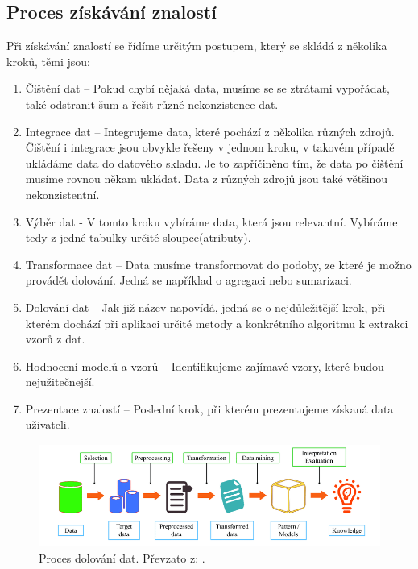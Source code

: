\subsection*{Proces získávání znalostí}
Při získávání znalostí se řídíme určitým postupem, který se skládá z několika kroků, těmi jsou: \cite[Kapitola~1]{Kamber}

\begin{enumerate}
  \item{Čištění dat – Pokud chybí nějaká data, musíme se se ztrátami vypořádat, také odstranit šum a řešit různé nekonzistence dat.}
  \item{Integrace dat – Integrujeme data, které pochází z několika různých zdrojů.
Čištění i integrace jsou obvykle řešeny v jednom kroku, v takovém případě ukládáme data do datového skladu.  Je to  zapříčiněno tím, že data po čištění musíme rovnou někam ukládat. Data z různých zdrojů jsou také většinou nekonzistentní.
}
  \item{Výběr dat -  V tomto kroku vybíráme data, která jsou relevantní. Vybíráme tedy z jedné tabulky určité sloupce(atributy).}
  \item{Transformace dat – Data musíme transformovat do podoby, ze které je možno provádět dolování. Jedná se například o agregaci nebo sumarizaci.}
  \item{Dolování dat – Jak již název napovídá, jedná se o nejdůležitější krok, při kterém dochází při aplikaci určité metody a konkrétního algoritmu k extrakci vzorů z dat.}
  \item{Hodnocení modelů a vzorů – Identifikujeme zajímavé vzory, které budou nejužitečnejší.}
  \item{Prezentace znalostí – Poslední krok, při kterém prezentujeme získaná data uživateli.}
\end{enumerate}

\begin{figure}[H]
    \begin{center}
        \includegraphics[width=130mm]{obrazky-figures/proces-mining.png}
    
        \caption{Proces dolování dat. Převzato z: \cite{datamining}.}
    \end{center}
    
\end{figure}



